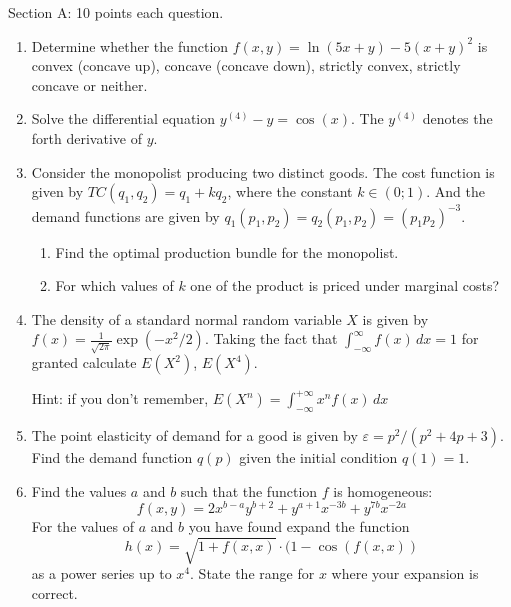 \documentclass[12pt]{article} %
\theoremstyle{definition} %
\begin{document}
Section A: 10 points  each question.
\begin{enumerate}
\item Determine whether the function $f(x,y)=\ln(5x+y)-5(x+y)^2$ is convex (concave up), concave (concave down), strictly convex, strictly concave or neither.



\item Solve the differential equation $y^{(4)}-y=\cos(x)$. The $y^{(4)}$ denotes the forth derivative of $y$.
\item Consider the monopolist producing two distinct goods. The cost function is given by $TC(q_1,q_2)=q_1+kq_2$, where the constant $k\in (0;1)$. And the demand functions are given by $q_1(p_1,p_2)=q_2(p_1,p_2)=(p_1p_2)^{-3}$.
\begin{enumerate}
\item Find the optimal production bundle for the monopolist.
\item For which values of $k$ one of the product is priced under marginal costs? %
\end{enumerate}
\item The density of a standard normal random variable $X$ is given by $f(x)=\frac{1}{\sqrt{2\pi}}\exp(-x^2/2)$. Taking the fact that $\int_{-\infty}^{\infty}f(x)\,dx=1$ for granted calculate $E(X^2)$, $E(X^4)$. %

Hint: if you don't remember, $E(X^n)=\int_{-\infty}^{+\infty}x^nf(x)\,dx$
\item The point elasticity of demand for a good is given by $\varepsilon=p^2/(p^2+4p+3)$. Find the demand function $q(p)$ given the initial condition $q(1)=1$.


\item Find the values $a$ and $b$ such that the function $f$ is homogeneous:
\[f(x,y)=2x^{b-a}y^{b+2}+y^{a+1}x^{-3b}+y^{7b}x^{-2a}\]
For the values of $a$ and $b$ you have found expand the function \[h(x)=\sqrt{1+f(x,x)}\cdot (1-\cos(f(x,x))\] as a power series up to $x^4$. State the range for $x$  where your expansion is correct.

\end{enumerate}
\end{document}
